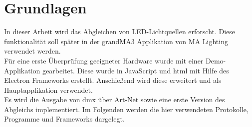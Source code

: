 \documentclass[11pt]{scrartcl}
\begin{document}
\section{Grundlagen}
In dieser Arbeit wird das Abgleichen von LED-Lichtquellen erforscht. Diese funktionalität soll später in der
grandMA3 Applikation von MA Lighting verwendet werden.\\
Für eine erste Überprüfung geeigneter Hardware wurde mit einer Demo-Applikation gearbeitet. Diese wurde
in JavaScript und \ac{html} mit Hilfe des Electron Frameworks erstellt. Anschießend wird diese erweitert und
als Hauptapplikation verwendet.\\
Es wird die Ausgabe von \ac{dmx} über Art-Net sowie eine erste Version des Abgleichs implementiert. Im
Folgenden werden die hier verwendeten Protokolle, Programme und Frameworks dargelegt.
\end{document}
